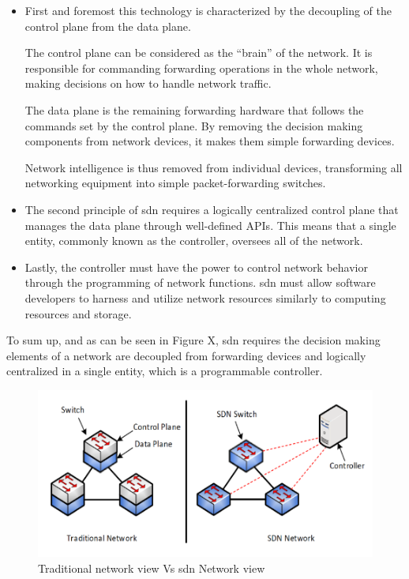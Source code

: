 \begin{itemize}
	\item First and foremost this technology is characterized by the decoupling of the control plane from the data plane. 

\begin{figure}
    
\end{figure} 

    The control plane can be considered as the “brain” of the network. It is responsible for commanding forwarding operations in the whole network, making decisions on how to handle network traffic.  

    The data plane is the remaining forwarding hardware that follows the commands set by the control plane. By removing the decision making components from network devices, it makes them simple forwarding devices.

    Network intelligence is thus removed from individual devices, transforming all networking equipment into simple packet-forwarding switches.

	\item The second principle of \gls{sdn} requires a logically centralized control plane that manages the data plane through well-defined APIs. This means that a single entity, commonly known as the controller, oversees all of the network. 

	\item Lastly, the controller must have the power to control network behavior through the programming of network functions. \gls{sdn} must allow software developers to harness and utilize network resources similarly to computing resources and storage. 
\end{itemize}

To sum up, and as can be seen in Figure X, \gls{sdn} requires the decision making elements of a network are decoupled from forwarding devices and logically centralized in a single entity, which is a programmable controller. 

\begin{figure}
	\centering
	\includegraphics{Chapters/Figures/SDNs/sdn_vs_legacy.png}
	\caption{Traditional network view Vs \gls{sdn} Network view}
	\label{fig:sdn_vs_legacy}
\end{figure}

